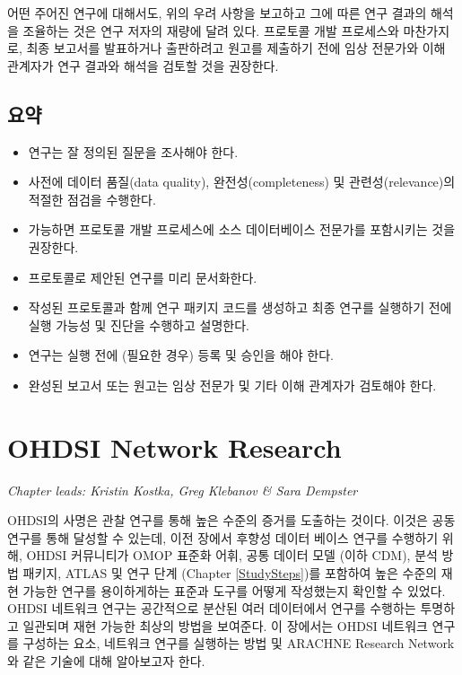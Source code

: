 \documentclass[11pt]{book}
\providecommand{\tightlist}{%
  \setlength{\itemsep}{0pt}\setlength{\parskip}{0pt}}
\theoremstyle{definition}
\theoremstyle{definition}
\theoremstyle{definition}
\theoremstyle{remark}
\let\BeginKnitrBlock\begin \let\EndKnitrBlock\end
\begin{document}
어떤 주어진 연구에 대해서도, 위의 우려 사항을 보고하고 그에 따른 연구
결과의 해석을 조율하는 것은 연구 저자의 재량에 달려 있다. 프로토콜 개발
프로세스와 마찬가지로, 최종 보고서를 발표하거나 출판하려고 원고를
제출하기 전에 임상 전문가와 이해 관계자가 연구 결과와 해석을 검토할 것을
권장한다.

\section{요약}\label{-3}

\BeginKnitrBlock{rmdsummary}
\begin{itemize}
\tightlist
\item
  연구는 잘 정의된 질문을 조사해야 한다.
\item
  사전에 데이터 품질(data quality), 완전성(completeness) 및
  관련성(relevance)의 적절한 점검을 수행한다.
\item
  가능하면 프로토콜 개발 프로세스에 소스 데이터베이스 전문가를
  포함시키는 것을 권장한다.
\item
  프로토콜로 제안된 연구를 미리 문서화한다.
\item
  작성된 프로토콜과 함께 연구 패키지 코드를 생성하고 최종 연구를
  실행하기 전에 실행 가능성 및 진단을 수행하고 설명한다.
\item
  연구는 실행 전에 (필요한 경우) 등록 및 승인을 해야 한다.
\item
  완성된 보고서 또는 원고는 임상 전문가 및 기타 이해 관계자가 검토해야
  한다.
\end{itemize}
\EndKnitrBlock{rmdsummary}

\chapter{OHDSI Network Research}\label{NetworkResearch}

\emph{Chapter leads: Kristin Kostka, Greg Klebanov \& Sara Dempster}

OHDSI의 사명은 관찰 연구를 통해 높은 수준의 증거를 도출하는 것이다.
이것은 공동 연구를 통해 달성할 수 있는데, 이전 장에서 후향성 데이터
베이스 연구를 수행하기 위해, OHDSI 커뮤니티가 OMOP 표준화 어휘, 공통
데이터 모델 (이하 CDM), 분석 방법 패키지, ATLAS 및 연구 단계 (Chapter
\ref{StudySteps})를 포함하여 높은 수준의 재현 가능한 연구를 용이하게하는
표준과 도구를 어떻게 작성했는지 확인할 수 있었다. OHDSI 네트워크 연구는
공간적으로 분산된 여러 데이터에서 연구를 수행하는 투명하고 일관되며 재현
가능한 최상의 방법을 보여준다. 이 장에서는 OHDSI 네트워크 연구를
구성하는 요소, 네트워크 연구를 실행하는 방법 및 ARACHNE Research
Network와 같은 기술에 대해 알아보고자 한다.
\end{document}
